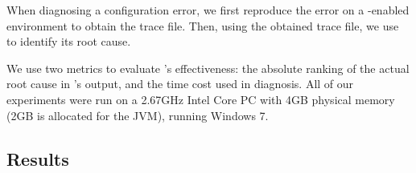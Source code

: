 


When diagnosing a configuration error, we first reproduce the
error on a \ourtool-enabled environment to obtain the
trace file. Then, using the obtained trace file, we use \ourtool
to identify its root cause.


We use two metrics to evaluate \ourtool's effectiveness:
the absolute ranking of the actual root cause in \ourtool's output,
and the time cost used in diagnosis.
All of our experiments were run on a
2.67GHz Intel Core PC with 4GB physical memory (2GB is allocated
for the JVM), running Windows 7.


\subsection{Results}
\label{sec:results}

